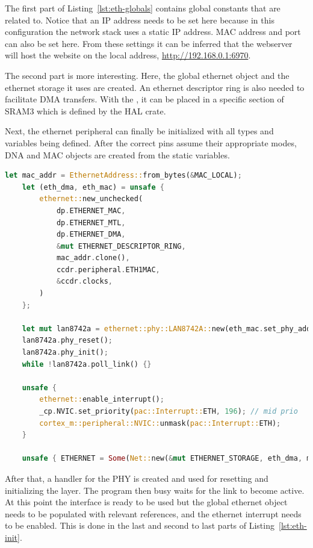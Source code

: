 The first part of Listing~\ref{lst:eth-globals} contains global constants that are related to. Notice that an IP address needs to be set here because in this configuration the network stack uses a static IP address. MAC address and port can also be set here. From these settings it can be inferred that the webserver will host the website on the local address, \url{http://192.168.0.1:6970}.

The second part is more interesting. Here, the global ethernet object and the ethernet storage it uses are created. An ethernet descriptor ring is also needed to facilitate DMA transfers. With the \mycode{#[link_section = ".sram3.eth]}, it can be placed in a specific section of SRAM3 which is defined by the HAL crate.

Next, the ethernet peripheral can finally be initialized with all types and variables being defined. After the correct pins assume their appropriate modes, DNA and MAC objects are created from the static variables.

\begin{lstlisting}[language=Rust,frame=single,float=!ht,style=customrust,label={lst:eth-init},caption={Initialization of the Ethernet Peripheral}]
    let mac_addr = EthernetAddress::from_bytes(&MAC_LOCAL);
    let (eth_dma, eth_mac) = unsafe {
        ethernet::new_unchecked(
            dp.ETHERNET_MAC,
            dp.ETHERNET_MTL,
            dp.ETHERNET_DMA,
            &mut ETHERNET_DESCRIPTOR_RING,
            mac_addr.clone(),
            ccdr.peripheral.ETH1MAC,
            &ccdr.clocks,
        )
    };

    let mut lan8742a = ethernet::phy::LAN8742A::new(eth_mac.set_phy_addr(0));
    lan8742a.phy_reset();
    lan8742a.phy_init();
    while !lan8742a.poll_link() {}

    unsafe {
        ethernet::enable_interrupt();
        _cp.NVIC.set_priority(pac::Interrupt::ETH, 196); // mid prio
        cortex_m::peripheral::NVIC::unmask(pac::Interrupt::ETH);
    }

    unsafe { ETHERNET = Some(Net::new(&mut ETHERNET_STORAGE, eth_dma, mac_addr)); }
\end{lstlisting}

After that, a handler for the PHY is created and used for resetting and initializing the layer. The program then busy waits for the link to become active. At this point the interface is ready to be used but the global ethernet object needs to be populated with relevant references, and the ethernet interrupt needs to be enabled. This is done in the last and second to last parts of Listing~\ref{lst:eth-init}.

